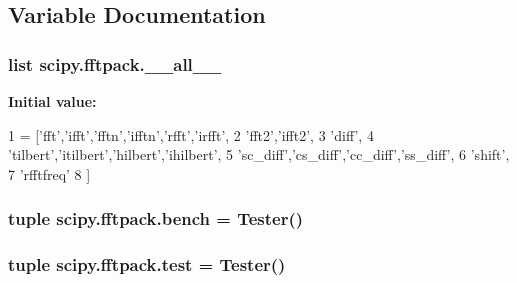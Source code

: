 \subsection{Variable Documentation}
\hypertarget{namespacescipy_1_1fftpack_a7ca2dcf4bb2b229a4da1f2633bde070e}{}
\subsubsection[{\+\_\+\+\_\+all\+\_\+\+\_\+}]{\setlength{\rightskip}{0pt plus 5cm}list scipy.\+fftpack.\+\_\+\+\_\+all\+\_\+\+\_\+}\label{namespacescipy_1_1fftpack_a7ca2dcf4bb2b229a4da1f2633bde070e}
{\bfseries Initial value\+:}
\begin{DoxyCode}
1 = [\textcolor{stringliteral}{'fft'},\textcolor{stringliteral}{'ifft'},\textcolor{stringliteral}{'fftn'},\textcolor{stringliteral}{'ifftn'},\textcolor{stringliteral}{'rfft'},\textcolor{stringliteral}{'irfft'},
2            \textcolor{stringliteral}{'fft2'},\textcolor{stringliteral}{'ifft2'},
3            \textcolor{stringliteral}{'diff'},
4            \textcolor{stringliteral}{'tilbert'},\textcolor{stringliteral}{'itilbert'},\textcolor{stringliteral}{'hilbert'},\textcolor{stringliteral}{'ihilbert'},
5            \textcolor{stringliteral}{'sc\_diff'},\textcolor{stringliteral}{'cs\_diff'},\textcolor{stringliteral}{'cc\_diff'},\textcolor{stringliteral}{'ss\_diff'},
6            \textcolor{stringliteral}{'shift'},
7            \textcolor{stringliteral}{'rfftfreq'}
8            ]
\end{DoxyCode}
\hypertarget{namespacescipy_1_1fftpack_a18a86b13f1ebf6ffe7157c7843ce3ad4}{}
\subsubsection[{bench}]{\setlength{\rightskip}{0pt plus 5cm}tuple scipy.\+fftpack.\+bench = Tester()}\label{namespacescipy_1_1fftpack_a18a86b13f1ebf6ffe7157c7843ce3ad4}
\hypertarget{namespacescipy_1_1fftpack_a28c62e1d92ccd84a78bafefbc4cb67a5}{}
\subsubsection[{test}]{\setlength{\rightskip}{0pt plus 5cm}tuple scipy.\+fftpack.\+test = Tester()}\label{namespacescipy_1_1fftpack_a28c62e1d92ccd84a78bafefbc4cb67a5}
